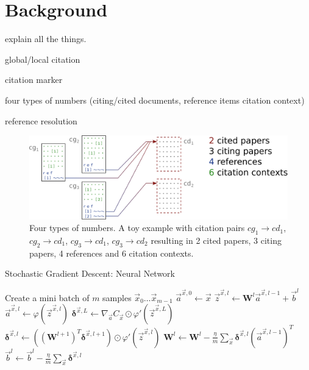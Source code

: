 \chapter{Background}\label{chap:background}
explain all the things.

global/local citation

citation marker

four types of numbers (citing/cited documents, reference items citation context)

reference resolution

\begin{figure}
  \centering
    \includegraphics[width=\textwidth]{figures/background/four_types_of_numbers_vertsqueeze.pdf}
  \caption[Four types of numbers.]{Four types of numbers. A toy example with citation pairs $cg_1\rightarrow cd_1$, $cg_2\rightarrow cd_1$, $cg_3\rightarrow cd_1$, $cg_3\rightarrow cd_2$ resulting in 2 cited papers, 3 citing papers, 4 references and 6 citation contexts.}
  \label{fig:fournumbers}
\end{figure}

\begin{algorithm}[p]
\caption{Stochastic Gradient Descent: Neural Network}
\label{alg:backpropnn}
\begin{algorithmic}
    \State Create a mini batch of $m$ samples $\vec{x}_0 \ldots \vec{x}_{m-1}$
        \State $\vec{a}^{\vec{x},0} \gets \vec{x}$  
          
            \State $\vec{z}^{\vec{x},l} \gets \mathbf{W}^l \vec{a}^{\vec{x},l-1}+\vec{b}^l$
            \State $\vec{a}^{\vec{x},l} \gets \varphi(\vec{z}^{\vec{x},l})$
        \EndFor
        \State $\bm{\delta}^{\vec{x},L} \gets \nabla_{\vec{a}} C_\vec{x} \odot \varphi'(\vec{z}^{\vec{x},L})$ 
          
            \State $\bm{\delta}^{\vec{x},l} \gets ((\mathbf{W}^{l+1})^T \bm{\delta}^{\vec{x},l+1})\odot \varphi'(\vec{z}^{\vec{x},l})$
        \EndFor
    \EndFor
     
        \State $ \mathbf{W}^l \gets \mathbf{W}^l-\frac{\eta}{m} \sum_\vec{x} \bm{\delta}^{\vec{x},l} (\vec{a}^{\vec{x},l-1})^T$
        \State $\vec{b}^l \gets \vec{b}^l-\frac{\eta}{m}\sum_\vec{x} \bm{\delta}^{\vec{x},l}$
    \EndFor
\end{algorithmic}
\end{algorithm}

